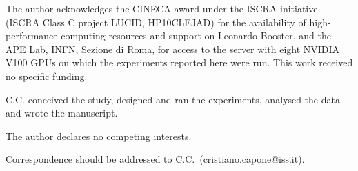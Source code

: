 \documentclass{nature}
\begin{document}


\begin{addendum}
 \item[Acknowledgements] The author acknowledges the CINECA award under the ISCRA initiative (ISCRA Class C project
 LUCID, HP10CLEJAD) for the availability of high-performance computing resources and support on Leonardo Booster,
 and the APE Lab, INFN, Sezione di Roma, for access to the server with eight NVIDIA V100 GPUs on which the
 experiments reported here were run. This work received no specific funding.
 \item[Author contributions] C.C. conceived the study, designed and ran the experiments, analysed the data and wrote the manuscript.
 \item[Competing interests] The author declares no competing interests.
 \item[Correspondence] Correspondence should be addressed to C.C.~(cristiano.capone@iss.it).
\end{addendum}
\end{document}
